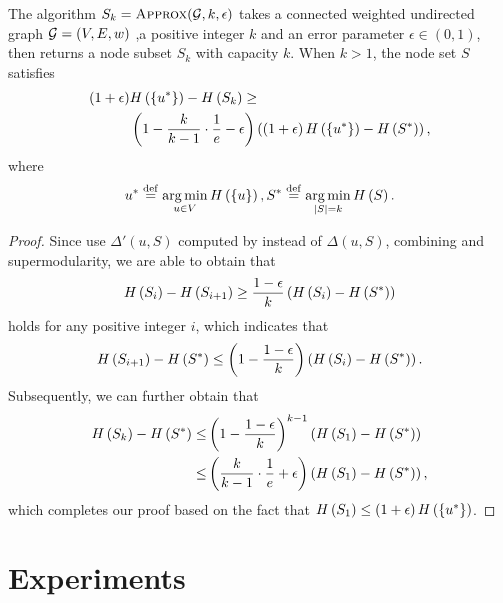 \documentclass[sigconf]{acmart}
\begin{document}
\begin{theorem}
  The algorithm \(S_k=\textsc{Approx}(\mathcal{G},k,\epsilon)\) takes a connected weighted undirected graph \(\mathcal{G}=(V,E,w)\) ,a positive integer \(k\) and an error parameter \(\epsilon\in(0,1)\), then returns a node subset \(S_k\) with capacity \(k\). When \(k>1\), the node set \(S\) satisfies
  \begin{align*}
    \left( 1+\epsilon \right) & H\left(\left\{u^* \right\}\right)-H\left(S_k\right)\ge                                                                         \\
                       & \left( 1-\frac{k}{k-1}\cdot\frac{1}{e}-\epsilon \right)\left( \left( 1+\epsilon \right)H\left(\left\{u^* \right\}\right)-H\left(S^*\right) \right),
  \end{align*}
  where
  \[u^*\stackrel{\mathrm{def}}{=}\operatorname*{arg\,min}_{u\in V}H\left(\left\{u \right\}\right),S^*\stackrel{\mathrm{def}}{=}\operatorname*{arg\,min}_{\left|S \right|=k}H\left(S\right).\]
\end{theorem}
\begin{proof}
  Since  use \(\Delta'(u,S)\) computed by  instead of \(\Delta(u,S)\), combining  and supermodularity, we are able to obtain that
  \[H\left(S_i\right)-H\left(S_{i+1}\right)\ge\frac{1-\epsilon}{k}\left( H\left(S_i\right)-H\left(S^*\right) \right)\]
  holds for any positive integer \(i\), which indicates that
  \[H\left(S_{i+1}\right)-H\left(S^*\right)\le\left( 1-\frac{1-\epsilon}{k} \right)\left( H\left(S_i\right)-H\left(S^*\right) \right).\]
  Subsequently, we can further obtain that
  \begin{align*}
    H\left(S_k\right)-H\left(S^*\right) \le & \left( 1-\frac{1-\epsilon}{k} \right)^{k-1}\left( H\left(S_1\right)-H\left(S^*\right) \right)            \\
    \le                       & \left( \frac{k}{k-1}\cdot\frac{1}{e}+\epsilon \right)\left( H\left(S_1\right)-H\left(S^*\right) \right),
  \end{align*}
  which completes our proof based on the fact that \(H\left(S_1\right)\le\left( 1+\epsilon \right)H\left(\left\{u^* \right\}\right)\).
\end{proof}

\section{Experiments}\label{sec:experiments}
\end{document}
